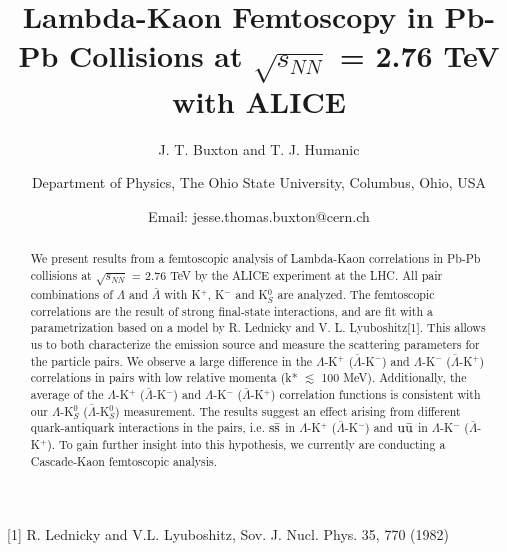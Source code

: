 \documentclass[ALICE,manyauthors]{ALICE_analysis_notes}
\begin{document}
%
%
%
\begin{titlepage}
%
\PHnumber{} 
\PHdate{\today}
%
\title{Lambda-Kaon Femtoscopy in Pb-Pb Collisions at $\sqrt{s_{NN}}$ = 2.76 TeV with ALICE}
%
\author{J. T. Buxton and T. J. Humanic}
\author{
Department of Physics, The Ohio State University, Columbus, Ohio, USA\\
}
\author{Email: jesse.thomas.buxton@cern.ch}
\begin{abstract}
We present results from a femtoscopic analysis of Lambda-Kaon correlations in Pb-Pb collisions at $\sqrt{s_{NN}}$ = 2.76 TeV by the ALICE experiment at the LHC.  All pair combinations of $\Lambda$ and $\bar{\Lambda}$ with K$^{+}$, K$^{-}$ and K$^{0}_{S}$ are analyzed.  The femtoscopic correlations are the result of strong final-state interactions, and are fit with a parametrization based on a model by R. Lednicky and V. L. Lyuboshitz[1].  This allows us to both characterize the emission source and measure the scattering parameters for the particle pairs.  We observe a large difference in the $\Lambda$-K$^{+}$ ($\bar{\Lambda}$-K$^{-}$) and $\Lambda$-K$^{-}$ ($\bar{\Lambda}$-K$^{+}$) correlations in pairs with low relative momenta (k* $\lesssim$ 100 MeV).  Additionally, the average of the $\Lambda$-K$^{+}$ ($\bar{\Lambda}$-K$^{-}$) and $\Lambda$-K$^{-}$ ($\bar{\Lambda}$-K$^{+}$) correlation functions is consistent with our $\Lambda$-K$^{0}_{S}$ ($\bar{\Lambda}$-K$^{0}_{S}$) measurement.  The results suggest an effect arising from different quark-antiquark interactions in the pairs, i.e. $\rm s\bar{s}$ in $\Lambda$-K$^{+}$ ($\bar{\Lambda}$-K$^{-}$) and $\rm u\bar{u}$ in $\Lambda$-K$^{-}$ ($\bar{\Lambda}$-K$^{+}$).  To gain further insight into this hypothesis, we currently are conducting a Cascade-Kaon femtoscopic analysis.
\end{abstract}

[1] R. Lednicky and V.L. Lyuboshitz, Sov. J. Nucl. Phys. 35, 770 (1982)
\end{titlepage}
\end{document}
